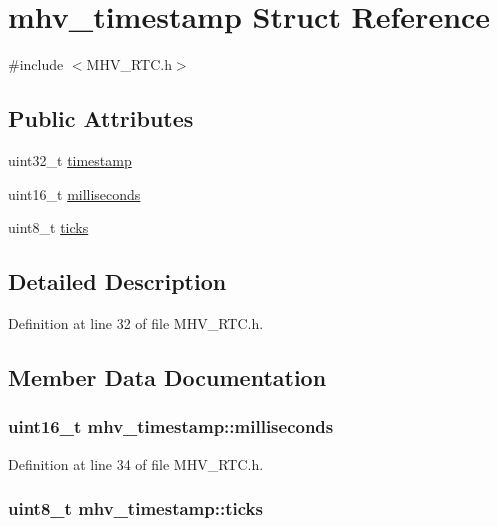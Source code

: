 \hypertarget{structmhv__timestamp}{
\section{mhv\-\_\-timestamp \-Struct \-Reference}
\label{structmhv__timestamp}
}


{\ttfamily \#include $<$\-M\-H\-V\-\_\-\-R\-T\-C.\-h$>$}

\subsection*{\-Public \-Attributes}
\begin{DoxyCompactItemize}
\item 
uint32\-\_\-t \hyperlink{structmhv__timestamp_a0f520358e057865fb12a9153cae820c5}{timestamp}
\item 
uint16\-\_\-t \hyperlink{structmhv__timestamp_a8285e4adf91b7ddbec8ab65b5ab855e1}{milliseconds}
\item 
uint8\-\_\-t \hyperlink{structmhv__timestamp_a9580508b8bfb37df0713ad6b4ad58636}{ticks}
\end{DoxyCompactItemize}


\subsection{\-Detailed \-Description}


\-Definition at line 32 of file \-M\-H\-V\-\_\-\-R\-T\-C.\-h.



\subsection{\-Member \-Data \-Documentation}
\hypertarget{structmhv__timestamp_a8285e4adf91b7ddbec8ab65b5ab855e1}{
\subsubsection[{milliseconds}]{\setlength{\rightskip}{0pt plus 5cm}uint16\-\_\-t {\bf mhv\-\_\-timestamp\-::milliseconds}}}
\label{structmhv__timestamp_a8285e4adf91b7ddbec8ab65b5ab855e1}


\-Definition at line 34 of file \-M\-H\-V\-\_\-\-R\-T\-C.\-h.

\hypertarget{structmhv__timestamp_a9580508b8bfb37df0713ad6b4ad58636}{
\subsubsection[{ticks}]{\setlength{\rightskip}{0pt plus 5cm}uint8\-\_\-t {\bf mhv\-\_\-timestamp\-::ticks}}}
\label{structmhv__timestamp_a9580508b8bfb37df0713ad6b4ad58636}


